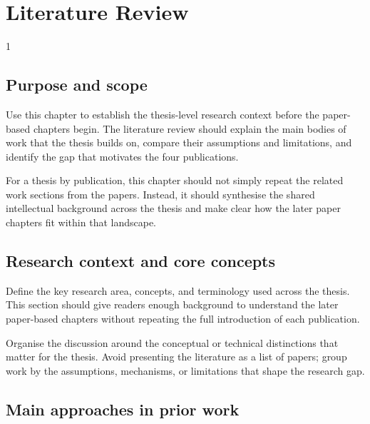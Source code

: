 \doublespacing %

\chapter{Literature Review}
\label{ch:literature-review}

\begin{spacing}{1} %
\minitoc %
\end{spacing} %
\thesisspacing %

\section{Purpose and scope}

Use this chapter to establish the thesis-level research context before the paper-based chapters begin. The literature review should explain the main bodies of work that the thesis builds on, compare their assumptions and limitations, and identify the gap that motivates the four publications.

For a thesis by publication, this chapter should not simply repeat the related work sections from the papers. Instead, it should synthesise the shared intellectual background across the thesis and make clear how the later paper chapters fit within that landscape.

\section{Research context and core concepts}

Define the key research area, concepts, and terminology used across the thesis. This section should give readers enough background to understand the later paper-based chapters without repeating the full introduction of each publication.

Organise the discussion around the conceptual or technical distinctions that matter for the thesis. Avoid presenting the literature as a list of papers; group work by the assumptions, mechanisms, or limitations that shape the research gap.

\section{Main approaches in prior work}

